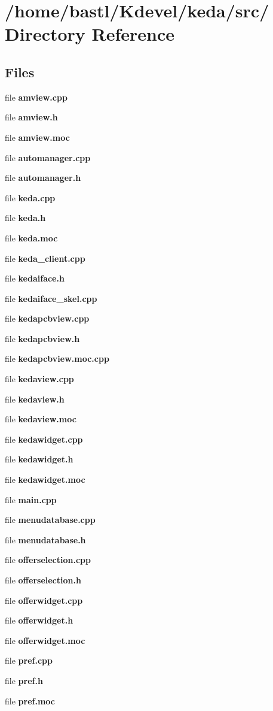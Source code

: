 \section{/home/bastl/Kdevel/keda/src/ Directory Reference}
\label{dir__2Fhome_2Fbastl_2FKdevel_2Fkeda_2Fsrc_2F}
\subsection*{Files}
\begin{CompactItemize}
\item 
file {\bf amview.cpp}
\item 
file {\bf amview.h}
\item 
file {\bf amview.moc}
\item 
file {\bf automanager.cpp}
\item 
file {\bf automanager.h}
\item 
file {\bf keda.cpp}
\item 
file {\bf keda.h}
\item 
file {\bf keda.moc}
\item 
file {\bf keda\_\-client.cpp}
\item 
file {\bf kedaiface.h}
\item 
file {\bf kedaiface\_\-skel.cpp}
\item 
file {\bf kedapcbview.cpp}
\item 
file {\bf kedapcbview.h}
\item 
file {\bf kedapcbview.moc.cpp}
\item 
file {\bf kedaview.cpp}
\item 
file {\bf kedaview.h}
\item 
file {\bf kedaview.moc}
\item 
file {\bf kedawidget.cpp}
\item 
file {\bf kedawidget.h}
\item 
file {\bf kedawidget.moc}
\item 
file {\bf main.cpp}
\item 
file {\bf menudatabase.cpp}
\item 
file {\bf menudatabase.h}
\item 
file {\bf offerselection.cpp}
\item 
file {\bf offerselection.h}
\item 
file {\bf offerwidget.cpp}
\item 
file {\bf offerwidget.h}
\item 
file {\bf offerwidget.moc}
\item 
file {\bf pref.cpp}
\item 
file {\bf pref.h}
\item 
file {\bf pref.moc}
\end{CompactItemize}
